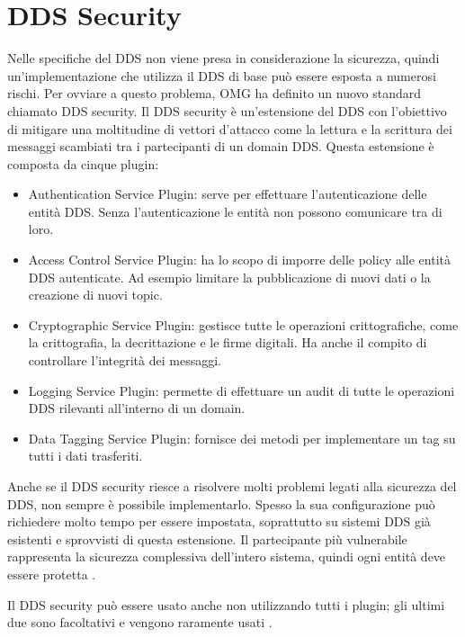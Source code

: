\section{DDS Security}
Nelle specifiche del DDS non viene presa in considerazione la sicurezza, quindi
un'implementazione che utilizza il DDS di base può essere esposta a numerosi 
rischi. Per ovviare a questo problema, OMG ha definito un nuovo standard 
chiamato DDS security. Il DDS security è un'estensione del DDS con 
l'obiettivo di mitigare una moltitudine di vettori d'attacco come 
la lettura e la scrittura dei messaggi scambiati tra i partecipanti di un 
domain DDS. Questa estensione è composta da cinque plugin:
\begin{itemize}
    \item Authentication Service Plugin: serve per effettuare l'autenticazione 
    delle entità DDS. Senza l'autenticazione le entità non possono
    comunicare tra di loro.
    \item Access Control Service Plugin: ha lo scopo di imporre 
    delle policy alle entità DDS autenticate. Ad esempio limitare
    la pubblicazione di nuovi dati o la creazione di nuovi topic.
    \item Cryptographic Service Plugin: gestisce tutte le operazioni 
    crittografiche, come la crittografia, la decrittazione e
    le firme digitali. Ha anche il compito di controllare l'integrità
    dei messaggi.
    \item Logging Service Plugin: permette di effettuare un audit di 
    tutte le operazioni DDS rilevanti all'interno di un domain.
    \item Data Tagging Service Plugin: fornisce dei metodi per implementare
    un tag su tutti i dati trasferiti. 
\end{itemize}
Anche se il DDS security riesce a risolvere molti problemi legati alla
sicurezza del DDS, non sempre è possibile implementarlo. Spesso 
la sua configurazione può richiedere molto tempo per essere 
impostata, soprattutto su sistemi DDS già esistenti e sprovvisti di 
questa estensione.
Il partecipante più vulnerabile rappresenta la sicurezza
complessiva dell'intero sistema, quindi ogni entità deve essere
protetta \cite{Michaud2017Apr}. 

Il DDS security può essere usato anche non utilizzando tutti i plugin;
gli ultimi due sono facoltativi e vengono 
raramente usati \cite{essay93639}. 
\label{DDS Security}



